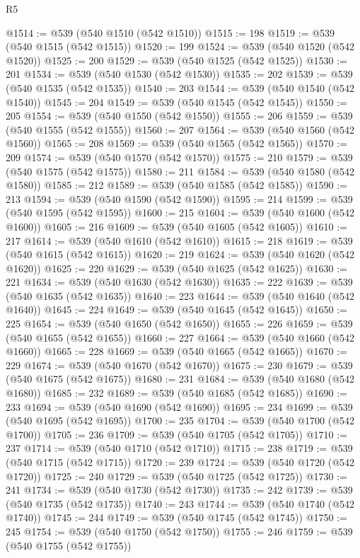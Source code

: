 \begin{lexlean}{R5}
\begin{coremodule}
@1514 := @539 (@540 @1510 (@542 @1510))
@1515 := 198
@1519 := @539 (@540 @1515 (@542 @1515))
@1520 := 199
@1524 := @539 (@540 @1520 (@542 @1520))
@1525 := 200
@1529 := @539 (@540 @1525 (@542 @1525))
@1530 := 201
@1534 := @539 (@540 @1530 (@542 @1530))
@1535 := 202
@1539 := @539 (@540 @1535 (@542 @1535))
@1540 := 203
@1544 := @539 (@540 @1540 (@542 @1540))
@1545 := 204
@1549 := @539 (@540 @1545 (@542 @1545))
@1550 := 205
@1554 := @539 (@540 @1550 (@542 @1550))
@1555 := 206
@1559 := @539 (@540 @1555 (@542 @1555))
@1560 := 207
@1564 := @539 (@540 @1560 (@542 @1560))
@1565 := 208
@1569 := @539 (@540 @1565 (@542 @1565))
@1570 := 209
@1574 := @539 (@540 @1570 (@542 @1570))
@1575 := 210
@1579 := @539 (@540 @1575 (@542 @1575))
@1580 := 211
@1584 := @539 (@540 @1580 (@542 @1580))
@1585 := 212
@1589 := @539 (@540 @1585 (@542 @1585))
@1590 := 213
@1594 := @539 (@540 @1590 (@542 @1590))
@1595 := 214
@1599 := @539 (@540 @1595 (@542 @1595))
@1600 := 215
@1604 := @539 (@540 @1600 (@542 @1600))
@1605 := 216
@1609 := @539 (@540 @1605 (@542 @1605))
@1610 := 217
@1614 := @539 (@540 @1610 (@542 @1610))
@1615 := 218
@1619 := @539 (@540 @1615 (@542 @1615))
@1620 := 219
@1624 := @539 (@540 @1620 (@542 @1620))
@1625 := 220
@1629 := @539 (@540 @1625 (@542 @1625))
@1630 := 221
@1634 := @539 (@540 @1630 (@542 @1630))
@1635 := 222
@1639 := @539 (@540 @1635 (@542 @1635))
@1640 := 223
@1644 := @539 (@540 @1640 (@542 @1640))
@1645 := 224
@1649 := @539 (@540 @1645 (@542 @1645))
@1650 := 225
@1654 := @539 (@540 @1650 (@542 @1650))
@1655 := 226
@1659 := @539 (@540 @1655 (@542 @1655))
@1660 := 227
@1664 := @539 (@540 @1660 (@542 @1660))
@1665 := 228
@1669 := @539 (@540 @1665 (@542 @1665))
@1670 := 229
@1674 := @539 (@540 @1670 (@542 @1670))
@1675 := 230
@1679 := @539 (@540 @1675 (@542 @1675))
@1680 := 231
@1684 := @539 (@540 @1680 (@542 @1680))
@1685 := 232
@1689 := @539 (@540 @1685 (@542 @1685))
@1690 := 233
@1694 := @539 (@540 @1690 (@542 @1690))
@1695 := 234
@1699 := @539 (@540 @1695 (@542 @1695))
@1700 := 235
@1704 := @539 (@540 @1700 (@542 @1700))
@1705 := 236
@1709 := @539 (@540 @1705 (@542 @1705))
@1710 := 237
@1714 := @539 (@540 @1710 (@542 @1710))
@1715 := 238
@1719 := @539 (@540 @1715 (@542 @1715))
@1720 := 239
@1724 := @539 (@540 @1720 (@542 @1720))
@1725 := 240
@1729 := @539 (@540 @1725 (@542 @1725))
@1730 := 241
@1734 := @539 (@540 @1730 (@542 @1730))
@1735 := 242
@1739 := @539 (@540 @1735 (@542 @1735))
@1740 := 243
@1744 := @539 (@540 @1740 (@542 @1740))
@1745 := 244
@1749 := @539 (@540 @1745 (@542 @1745))
@1750 := 245
@1754 := @539 (@540 @1750 (@542 @1750))
@1755 := 246
@1759 := @539 (@540 @1755 (@542 @1755))

\end{coremodule}
\end{lexlean}
